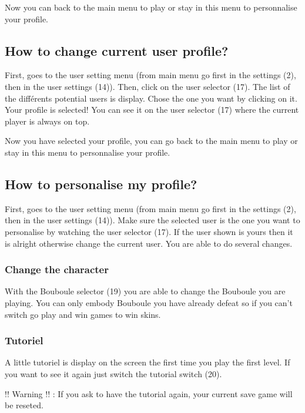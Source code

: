 \documentclass[a4paper,10pt]{report}
\begin{document}
Now you can back to the main menu to play or stay in this menu to personnalise your profile.

	\subsection*{How to change current user profile?}
	
First, goes to the user setting menu (from main menu go first in the settings (2), then in the user settings (14)). Then, click on the user selector (17). The list of the différents potential users is display. Chose the one you want by clicking on it. Your profile is selected! You can see it on the user selector (17) where the current player is always on top.

Now you have selected your profile, you can go back to the main menu to play or stay in this menu to personnalise your profile.

	\subsection*{How to personalise my profile?}

First, goes to the user setting menu (from main menu go first in the settings (2), then in the user settings (14)). Make sure the selected user is the one you want to personalise by watching the user selector (17). If the user shown is yours then it is alright otherwise change the current user. You are able to do several changes.

		\subsubsection*{Change the character}

With the Bouboule selector (19) you are able to change the Bouboule you are playing. You can only embody Bouboule you have already defeat so if you can't switch go play and win games to win skins.

		\subsubsection*{Tutoriel}

A little tutoriel is display on the screen the first time you play the first level. If you want to see it again just switch the tutorial switch (20).

!! Warning !! : If you ask to have the tutorial again, your current save game will be reseted.
\end{document}
